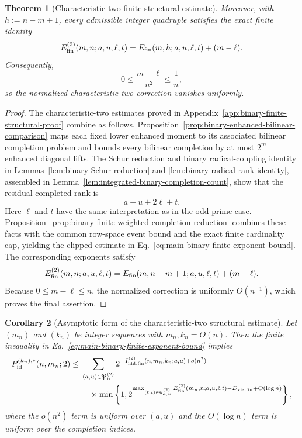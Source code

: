 \documentclass[11pt]{article}
\newcommand{\1}{\mathbf 1}
\theoremstyle{plain}
\newtheorem{theorem}{Theorem}[section]
\newtheorem{corollary}[theorem]{Corollary}
\theoremstyle{definition}
\theoremstyle{remark}
\begin{document}
\begin{theorem}[Characteristic-two finite structural estimate]
Moreover, with $h:=n-m+1$, every admissible integer quadruple satisfies the
exact finite identity
\begin{equation}
 E_{\rm fin}^{(2)}(m,n;a,u,\ell,t)
 =E_{\rm fin}(m,h;a,u,\ell,t)+(m-\ell).
 \label{eq:main-binary-finite-exponent-identity}
\end{equation}
Consequently,
\begin{equation}
 0\le\frac{m-\ell}{n^2}\le\frac1n,
 \label{eq:theorem-C-normalized-correction-bound}
\end{equation}
so the normalized characteristic-two correction vanishes uniformly.
\end{theorem}



\begin{proof}
The characteristic-two estimates proved in
Appendix~\ref{app:binary-finite-structural-proof} combine as follows.  Proposition~\ref{prop:binary-enhanced-bilinear-comparison}
maps each fixed lower enhanced moment to its associated bilinear completion
problem and bounds every bilinear completion by at most $2^m$ enhanced
diagonal lifts.  The Schur reduction and binary radical-coupling identity in
Lemmas~\ref{lem:binary-Schur-reduction} and
\ref{lem:binary-radical-rank-identity}, assembled in
Lemma~\ref{lem:integrated-binary-completion-count}, show that the residual
completed rank is
\[
 a-u+2\ell+t.
\]
Here $\ell$ and $t$ have the same interpretation as in the odd-prime case.  Proposition~\ref{prop:binary-finite-weighted-completion-reduction}
combines these facts with the common row-space event bound and the exact
finite cardinality cap, yielding the clipped estimate in
Eq.~\eqref{eq:main-binary-finite-exponent-bound}.  The corresponding exponents satisfy
\[
 E_{\rm fin}^{(2)}(m,n;a,u,\ell,t)
 =E_{\rm fin}(m,n-m+1;a,u,\ell,t)+(m-\ell).
\]
Because $0\le m-\ell\le n$, the normalized correction is uniformly
$O(n^{-1})$, which proves the final assertion.
\end{proof}

\begin{corollary}[Asymptotic form of the characteristic-two structural estimate]
\label{cor:binary-structural-asymptotic-form}
Let $(m_n)$ and $(k_n)$ be integer sequences with $m_n,k_n=O(n)$.  Then the
finite inequality in Eq.~\eqref{eq:main-binary-finite-exponent-bound} implies
\begin{align}
 P_{\mathrm{id}}^{(k_n),*}(n,m_n;2)
 \le{}&\sum_{(a,u)\in\mathfrak P_n^{(2)}}
 2^{-I_{\rm hid,fin}^{(2)}(n,m_n,k_n;a,u)+o(n^2)}\notag\\
 &\quad\times
 \min\left\{1,
 2^{\max_{(\ell,t)\in\mathcal G_{a,u}^{(2)}}
 E_{\rm fin}^{(2)}(m_n,n;a,u,\ell,t)
 -D_{\rm vis,fin}+O(\log n)}\right\},
 \label{eq:binary-structural-asymptotic-corollary}
\end{align}
where the $o(n^2)$ term is uniform over $(a,u)$ and the $O(\log n)$ term is
uniform over the completion indices.
\end{corollary}
\end{document}
